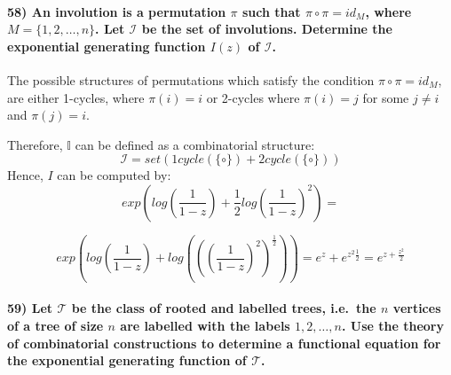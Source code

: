 \documentclass[
]{article}
\begin{document}
\hypertarget{an-involution-is-a-permutation-pi-such-that-pi-circ-pi-id_m-where-m-12-dots-n.-let-mathcali-be-the-set-of-involutions.-determine-the-exponential-generating-function-iz-of-mathcali.}{%
\paragraph{\texorpdfstring{58) An involution is a permutation \(\pi\)
such that \(\pi \circ \pi = id_M\), where \(M = \{1,2, \dots, n\}\). Let
\(\mathcal{I}\) be the set of involutions. Determine the exponential
generating function \(I(z)\) of
\(\mathcal{I}\).}{58) An involution is a permutation \textbackslash pi such that \textbackslash pi \textbackslash circ \textbackslash pi = id\_M, where M = \textbackslash\{1,2, \textbackslash dots, n\textbackslash\}. Let \textbackslash mathcal\{I\} be the set of involutions. Determine the exponential generating function I(z) of \textbackslash mathcal\{I\}.}}\label{an-involution-is-a-permutation-pi-such-that-pi-circ-pi-id_m-where-m-12-dots-n.-let-mathcali-be-the-set-of-involutions.-determine-the-exponential-generating-function-iz-of-mathcali.}}

The possible structures of permutations which satisfy the condition
\(\pi \circ \pi = id_M\), are either 1-cycles, where \(\pi(i) = i\) or
2-cycles where \(\pi(i) = j\) for some \(j \neq i\) and \(\pi(j) = i\).

Therefore, \(\mathbb{I}\) can be defined as a combinatorial structure:
\[
\mathcal{I} = set(1cycle(\{\circ\}) + 2cycle(\{\circ\}))
\] Hence, \(I\) can be computed by: \[
exp\left(log(\frac{1}{1-z}) + \frac{1}{2} log(\frac{1}{1-z})^2\right) = 
\]

\[
exp\left(log(\frac{1}{1-z}) + log(((\frac{1}{1-z})^2)^{\frac{1}{2}})\right) = e^z + e^{z^2 \frac{1}{2}} = e^{z + \frac{z^2}{2}}
\]

\hypertarget{let-mathcalt-be-the-class-of-rooted-and-labelled-trees-i.e.-the-n-vertices-of-a-tree-of-size-n-are-labelled-with-the-labels-12-dots-n.-use-the-theory-of-combinatorial-constructions-to-determine-a-functional-equation-for-the-exponential-generating-function-of-mathcalt.}{%
\paragraph{\texorpdfstring{59) Let \(\mathcal{T}\) be the class of
rooted and labelled trees, i.e.~the \(n\) vertices of a tree of size
\(n\) are labelled with the labels \(1,2, \dots, n\). Use the theory of
combinatorial constructions to determine a functional equation for the
exponential generating function of
\(\mathcal{T}\).}{59) Let \textbackslash mathcal\{T\} be the class of rooted and labelled trees, i.e.~the n vertices of a tree of size n are labelled with the labels 1,2, \textbackslash dots, n. Use the theory of combinatorial constructions to determine a functional equation for the exponential generating function of \textbackslash mathcal\{T\}.}}\label{let-mathcalt-be-the-class-of-rooted-and-labelled-trees-i.e.-the-n-vertices-of-a-tree-of-size-n-are-labelled-with-the-labels-12-dots-n.-use-the-theory-of-combinatorial-constructions-to-determine-a-functional-equation-for-the-exponential-generating-function-of-mathcalt.}}
\end{document}
